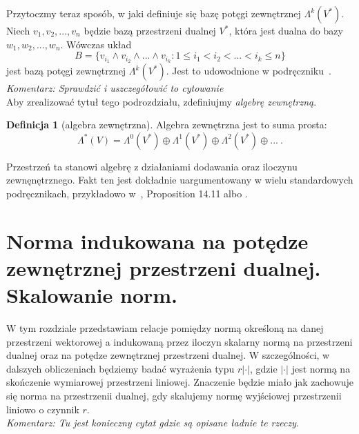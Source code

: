 \documentclass[licencjacka]{pracamgr}
\theoremstyle{definition}
\newtheorem{definition}{Definicja}[section]
\theoremstyle{definition}
\theoremstyle{plain}
\theoremstyle{plain}
\theoremstyle{plain}
\theoremstyle{plain}
\begin{document}
Przytoczmy teraz sposób, w jaki definiuje się bazę potęgi zewnętrznej
$\Lambda^k(V^\ast)$. Niech $v_1, v_2, ... , v_n$ będzie bazą przestrzeni dualnej
$V^\ast$, która jest dualna do bazy $w_1, w_2, ..., w_n$.
Wówczas układ
\[
  B = \{ v_{i_1} \wedge v_{i_2} \wedge ... \wedge v_{i_k} : 1 \leq i_1 < i_2 < ... <i_k \leq n \}
\]
jest bazą potęgi zewnętrznej $\Lambda^k(V^\ast)$. Jest to udowodnione w
podręczniku~\cite{kostrikin}. \emph{Komentarz: Sprawdzić i uszczegółowić to cytowanie} \\

Aby zrealizować tytuł tego podrozdziału, zdefiniujmy
\emph{algebrę zewnętrzną}.

\begin{definition}[algebra zewnętrzna]
Algebra zewnętrzna jest to suma prosta:
\[
\Lambda^\ast (V) = 
\Lambda^0(V^\ast) \oplus
\Lambda^1(V^\ast) \oplus
\Lambda^2(V^\ast) \oplus
...~.
\]
\end{definition}

Przestrzeń ta stanowi algebrę z działaniami dodawania oraz iloczynu zewnęnętrznego.
Fakt ten jest dokładnie uargumentowany w wielu standardowych podręcznikach,
przykładowo w~\cite{lee}, Proposition 14.11 albo \cite{kostrikin}.\\

\section{Norma indukowana na potędze zewnętrznej przestrzeni dualnej.
Skalowanie norm.}\label{norm-scaling}

W tym rozdziale przedstawiam relacje pomiędzy normą określoną na danej
przestrzeni wektorowej a indukowaną przez iloczyn skalarny normą na przestrzeni
dualnej oraz na potędze zewnętrznej przestrzeni dualnej.  W szczególności, w
dalszych obliczeniach będziemy badać wyrażenia typu $r |\cdot|$, gdzie
$|\cdot|$ jest normą na skończenie wymiarowej przestrzeni liniowej.  Znaczenie
będzie miało jak zachowuje się norma na przestrzenii dualnej, gdy skalujemy
normę wyjściowej przestrzenii liniowo o czynnik $r$. \\

\emph{Komentarz: Tu jest konieczny cytat gdzie są opisane ładnie te rzeczy}. \\
\end{document}
